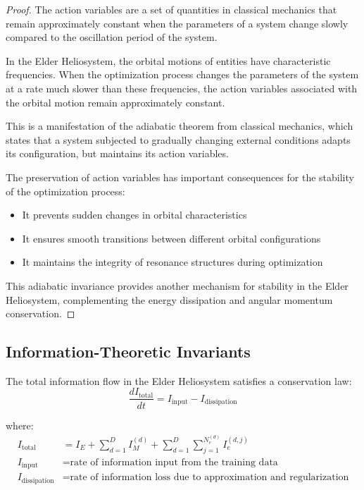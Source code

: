 \begin{proof}
The action variables are a set of quantities in classical mechanics that remain approximately constant when the parameters of a system change slowly compared to the oscillation period of the system.

In the Elder Heliosystem, the orbital motions of entities have characteristic frequencies. When the optimization process changes the parameters of the system at a rate much slower than these frequencies, the action variables associated with the orbital motion remain approximately constant.

This is a manifestation of the adiabatic theorem from classical mechanics, which states that a system subjected to gradually changing external conditions adapts its configuration, but maintains its action variables.

The preservation of action variables has important consequences for the stability of the optimization process:
\begin{itemize}
    \item It prevents sudden changes in orbital characteristics
    \item It ensures smooth transitions between different orbital configurations
    \item It maintains the integrity of resonance structures during optimization
\end{itemize}

This adiabatic invariance provides another mechanism for stability in the Elder Heliosystem, complementing the energy dissipation and angular momentum conservation.
\end{proof}

\subsection{Information-Theoretic Invariants}

\begin{theorem}
The total information flow in the Elder Heliosystem satisfies a conservation law:
\begin{equation}
\frac{dI_{\text{total}}}{dt} = I_{\text{input}} - I_{\text{dissipation}}
\end{equation}

where:
\begin{align}
I_{\text{total}} &= I_E + \sum_{d=1}^D I_M^{(d)} + \sum_{d=1}^D \sum_{j=1}^{N_e^{(d)}} I_e^{(d,j)} \\
I_{\text{input}} &= \text{rate of information input from the training data} \\
I_{\text{dissipation}} &= \text{rate of information loss due to approximation and regularization}
\end{align}
\end{theorem}

